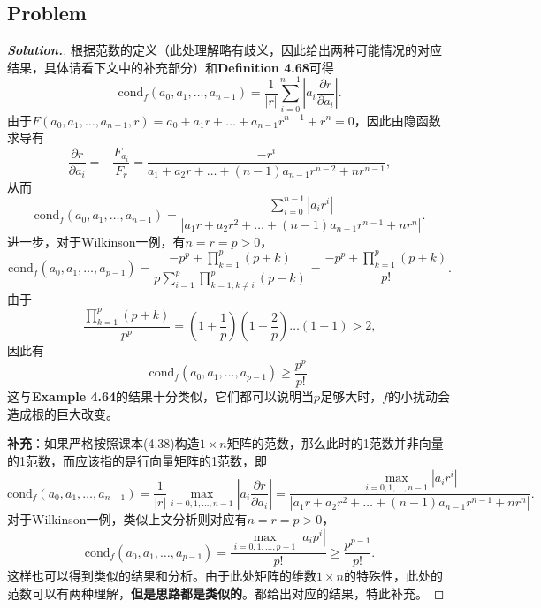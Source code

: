 \documentclass{ctexart}
\begin{document}
\begin{sloppypar}
\subsection*{Problem \uppercase\expandafter{}}
\begin{proof}[\textbf{Solution.}]
根据范数的定义（此处理解略有歧义，因此给出两种可能情况的对应结果，具体请看下文中的补充部分）和\textbf{Definition 4.68}可得
\begin{equation}
   \mathrm{cond}_f(a_0,a_1,\dots,a_{n-1}) = \frac{1}{|r|}\sum^{n-1}_{i=0}\left|a_i\frac{\partial r}{\partial a_i}\right|.
\end{equation}
由于$F(a_0,a_1,\dots,a_{n-1},r) = a_0 + a_1r+\dots+a_{n-1}r^{n-1} + r^n = 0$，因此由隐函数求导有
\begin{equation}
   \frac{\partial r}{\partial a_i} = -\frac{F_{a_i}}{F_r} = \frac{-r^{i}}{a_1+a_2r + \dots + (n-1)a_{n-1}r^{n-2} + nr^{n-1}},
\end{equation}
从而
\begin{equation}
   \mathrm{cond}_f(a_0,a_1,\dots,a_{n-1}) = \frac{\sum^{n-1}_{i=0}\left|a_ir^i\right|}{|a_1r+a_2r^2+\dots+(n-1)a_{n-1}r^{n-1}+nr^{n}|}.
\end{equation}
进一步，对于Wilkinson一例，有$n=r=p > 0$，
\begin{equation}
   \mathrm{cond}_f(a_0,a_1,\dots,a_{p-1}) = \frac{-p^p+\prod^{p}_{k=1}(p+k)}{p\sum^{p}_{i=1}\prod^{p}_{k = 1,k\neq i}(p-k)} = \frac{-p^p+\prod^{p}_{k=1}(p+k)}{p!}.
\end{equation}
由于
\begin{equation}
   \frac{\prod^{p}_{k=1}(p+k)}{p^p} = (1+\frac{1}{p})(1+\frac{2}{p})\dots(1+1) > 2,
\end{equation}
因此有
\begin{equation}
   \mathrm{cond}_f(a_0,a_1,\dots,a_{p-1}) \geq \frac{p^p}{p!}.
\end{equation}
这与\textbf{Example 4.64}的结果十分类似，它们都可以说明当$p$足够大时，$f$的小扰动会造成根的巨大改变。

\textbf{补充}：如果严格按照课本(4.38)构造$1 \times n$矩阵的范数，那么此时的1范数并非向量的1范数，而应该指的是行向量矩阵的1范数，即
\begin{equation}
   \mathrm{cond}_f(a_0,a_1,\dots,a_{n-1}) = \frac{1}{|r|}\max_{i=0,1,\dots,n-1}\left|a_i\frac{\partial r}{\partial a_i}\right|=\frac{\max_{i=0,1,\dots,n-1}\left|a_ir^i\right|}{|a_1r+a_2r^2+\dots+(n-1)a_{n-1}r^{n-1}+nr^{n}|}.
\end{equation}
对于Wilkinson一例，类似上文分析则对应有$n=r=p > 0$，
\begin{equation}
   \mathrm{cond}_f(a_0,a_1,\dots,a_{p-1}) = \frac{\max_{i=0,1,\dots,p-1}\left|a_ip^i\right|}{p!}\geq\frac{p^{p-1}}{p!}.
\end{equation}
这样也可以得到类似的结果和分析。由于此处矩阵的维数$1 \times n$的特殊性，此处的范数可以有两种理解，\textbf{但是思路都是类似的}。都给出对应的结果，特此补充。
\end{proof}

\end{sloppypar}
\end{document}
